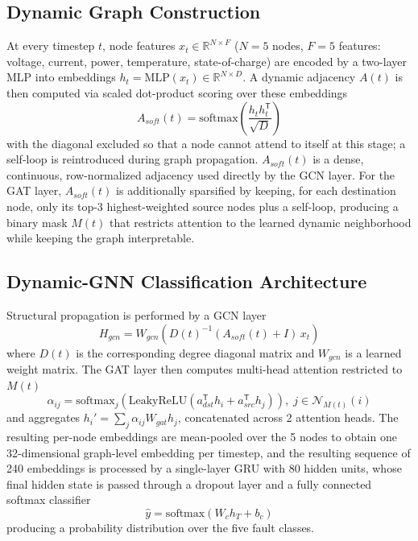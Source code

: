 \documentclass[conference]{IEEEtran}
\begin{document}
\subsection{Dynamic Graph Construction}

At every timestep $t$, node features $x_t \in \mathbb{R}^{N\times F}$ ($N{=}5$ nodes, $F{=}5$
features: voltage, current, power, temperature, state-of-charge) are encoded by a two-layer
MLP into embeddings $h_t = \text{MLP}(x_t) \in \mathbb{R}^{N\times D}$. A dynamic adjacency
$A(t)$ is then computed via scaled dot-product scoring over these embeddings
\begin{equation}
A_{soft}(t) = \text{softmax}\!\left( \frac{h_t h_t^{\mathsf{T}}}{\sqrt{D}} \right)
\label{eq:asoft}
\end{equation}
with the diagonal excluded so that a node cannot attend to itself at this stage; a self-loop
is reintroduced during graph propagation. $A_{soft}(t)$ is a dense, continuous,
row-normalized adjacency used directly by the GCN layer. For the GAT layer, $A_{soft}(t)$ is
additionally sparsified by keeping, for each destination node, only its top-3 highest-weighted
source nodes plus a self-loop, producing a binary mask $M(t)$ that restricts attention to the
learned dynamic neighborhood while keeping the graph interpretable.

\subsection{Dynamic-GNN Classification Architecture}

Structural propagation is performed by a GCN layer
\begin{equation}
H_{gcn} = W_{gcn} \left( D(t)^{-1} (A_{soft}(t) + I)\, x_t \right)
\label{eq:gcn}
\end{equation}
where $D(t)$ is the corresponding degree diagonal matrix and $W_{gcn}$ is a learned weight
matrix. The GAT layer then computes multi-head attention restricted to $M(t)$
\begin{equation}
\alpha_{ij} = \text{softmax}_j\!\left( \text{LeakyReLU}\!\left( a_{dst}^{\mathsf{T}} h_i + a_{src}^{\mathsf{T}} h_j \right) \right), \; j \in \mathcal{N}_{M(t)}(i)
\label{eq:gat}
\end{equation}
and aggregates $h_i' = \sum_j \alpha_{ij} W_{gat} h_j$, concatenated across 2 attention heads.
The resulting per-node embeddings are mean-pooled over the 5 nodes to obtain one
32-dimensional graph-level embedding per timestep, and the resulting sequence of 240
embeddings is processed by a single-layer GRU with 80 hidden units, whose final hidden state
is passed through a dropout layer and a fully connected softmax classifier
\begin{equation}
\hat{y} = \text{softmax}(W_c h_T + b_c)
\label{eq:classifier}
\end{equation}
producing a probability distribution over the five fault classes.
\end{document}
